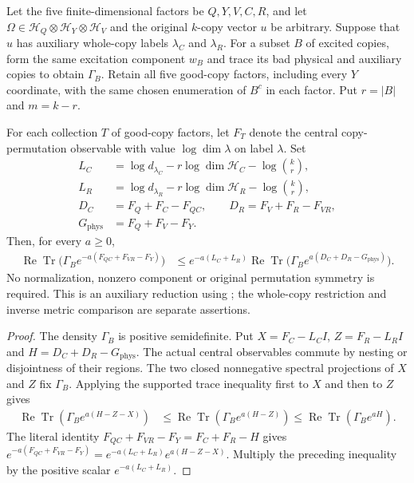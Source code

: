 \begin{theorem}
\label{thm:replica-good-auxiliary-exponential-drop}
\leanok
Let the five finite-dimensional factors be $Q,Y,V,C,R$, and let
$\Omega\in\mathcal H_Q\otimes\mathcal H_Y\otimes\mathcal H_V$ and the
original $k$-copy vector $u$ be arbitrary. Suppose that $u$ has auxiliary
whole-copy labels $\lambda_C$ and $\lambda_R$. For a subset $B$ of excited
copies, form the same excitation component $w_B$ and trace its bad physical
and auxiliary copies to obtain $\Gamma_B$. Retain all five good-copy
factors, including every $Y$ coordinate, with the same chosen enumeration
of $B^c$ in each factor. Put $r=|B|$ and $m=k-r$.

For each collection $T$ of good-copy factors, let $F_T$ denote the central
copy-permutation observable with value $\log\dim\lambda$ on label
$\lambda$. Set
\begin{align*}
 L_C&=\log d_{\lambda_C}-r\log\dim\mathcal H_C-\log\binom{k}{r},\\
 L_R&=\log d_{\lambda_R}-r\log\dim\mathcal H_R-\log\binom{k}{r},\\
 D_C&=F_Q+F_C-F_{QC},\qquad D_R=F_V+F_R-F_{VR},\\
 G_{\mathrm{phys}}&=F_Q+F_V-F_Y.
\end{align*}
Then, for every $a\ge0$,
\begin{align*}
 \operatorname{Re}\operatorname{Tr}
   \bigl(\Gamma_B e^{-a(F_{QC}+F_{VR}-F_Y)}\bigr)
 &\le e^{-a(L_C+L_R)}
   \operatorname{Re}\operatorname{Tr}
   \bigl(\Gamma_B e^{a(D_C+D_R-G_{\mathrm{phys}})}\bigr).
\end{align*}
No normalization, nonzero component or original permutation symmetry is
required. This is an auxiliary reduction using
\cite[Section~7]{OpenAI2026AreaLaw}; the
whole-copy restriction and inverse metric comparison are separate assertions.
\end{theorem}

\begin{proof}\leanok
{}
The density $\Gamma_B$ is positive semidefinite. Put
$X=F_C-L_CI$, $Z=F_R-L_RI$ and
$H=D_C+D_R-G_{\mathrm{phys}}$. The actual central observables commute
by nesting or disjointness of their regions. The two closed nonnegative
spectral projections of $X$ and $Z$ fix $\Gamma_B$. Applying the supported
trace inequality first to $X$ and then to $Z$ gives
\begin{align*}
 \operatorname{Re}\operatorname{Tr}(\Gamma_B e^{a(H-Z-X)})
 &\le\operatorname{Re}\operatorname{Tr}(\Gamma_B e^{a(H-Z)})
 \le\operatorname{Re}\operatorname{Tr}(\Gamma_B e^{aH}).
\end{align*}
The literal identity $F_{QC}+F_{VR}-F_Y=F_C+F_R-H$ gives
$e^{-a(F_{QC}+F_{VR}-F_Y)}=e^{-a(L_C+L_R)}e^{a(H-Z-X)}$.
Multiply the preceding inequality by the positive scalar $e^{-a(L_C+L_R)}$.
\end{proof}
